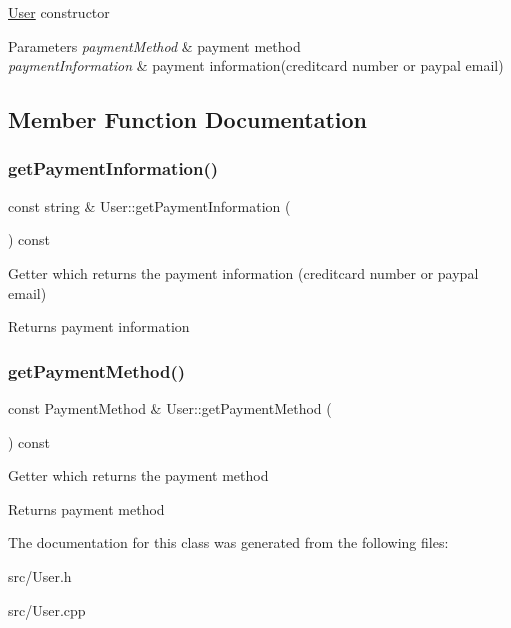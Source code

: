 \mbox{\hyperlink{class_user}{User}} constructor 
\begin{DoxyParams}{Parameters}
{\em payment\+Method} & payment method \\
\hline
{\em payment\+Information} & payment information(creditcard number or paypal email) \\
\hline
\end{DoxyParams}


\subsection{Member Function Documentation}
\mbox{\label{class_user_a815ed7790a21f851257aea04bbd43881}} 
\subsubsection{\texorpdfstring{get\+Payment\+Information()}{getPaymentInformation()}}
{\footnotesize\ttfamily const string \& User\+::get\+Payment\+Information (\begin{DoxyParamCaption}{ }\end{DoxyParamCaption}) const}

Getter which returns the payment information (creditcard number or paypal email) \begin{DoxyReturn}{Returns}
payment information 
\end{DoxyReturn}
\mbox{\label{class_user_a7945c31f5147c86e9577a8500ac51b8e}} 
\subsubsection{\texorpdfstring{get\+Payment\+Method()}{getPaymentMethod()}}
{\footnotesize\ttfamily const Payment\+Method \& User\+::get\+Payment\+Method (\begin{DoxyParamCaption}{ }\end{DoxyParamCaption}) const}

Getter which returns the payment method \begin{DoxyReturn}{Returns}
payment method 
\end{DoxyReturn}


The documentation for this class was generated from the following files\+:\begin{DoxyCompactItemize}
\item 
src/User.\+h\item 
src/User.\+cpp\end{DoxyCompactItemize}
